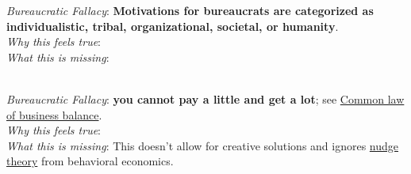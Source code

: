 \textit{Bureaucratic Fallacy}: \textbf{Motivations for bureaucrats are categorized as individualistic, tribal, organizational, societal, or humanity}.\\
\textit{Why this feels true}: \\
\textit{What this is missing}: 


\ \\

\textit{Bureaucratic Fallacy}: 
\textbf{you cannot pay a little and get a lot}; see \href{https://en.wikipedia.org/wiki/Common_law_of_business_balance}{Common law of business balance}. \\
\textit{Why this feels true}: \\
\textit{What this is missing}: This doesn't allow for creative solutions and ignores \href{https://en.wikipedia.org/wiki/Nudge_theory}{nudge theory} from behavioral economics. 

